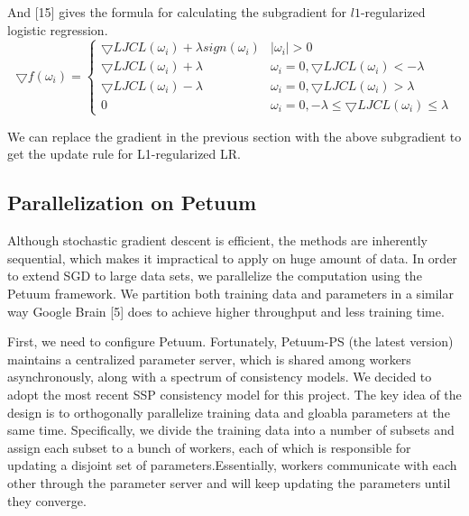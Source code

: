 \documentclass{article} %
\begin{document}
And [15] gives the formula for calculating the subgradient for $l1$-regularized logistic regression.
\begin{equation}
\bigtriangledown f(\omega_i) = \left\{\begin{matrix}
\bigtriangledown LJCL(\omega_i) + \lambda sign(\omega_i) & |\omega_i| > 0\\ 
\bigtriangledown LJCL(\omega_i) + \lambda & \omega_i=0,\bigtriangledown LJCL(\omega_i)<-\lambda\\ 
\bigtriangledown LJCL(\omega_i) - \lambda & \omega_i=0,\bigtriangledown LJCL(\omega_i)>\lambda\\ 
0 & \omega_i=0, -\lambda \le \bigtriangledown LJCL(\omega_i) \le \lambda
\end{matrix}\right.
\end{equation}

We can replace the gradient in the previous section with the above subgradient to get the update rule for L1-regularized LR.

\subsection{Parallelization on Petuum}
Although stochastic gradient descent is efficient, the methods are inherently sequential, which makes it impractical to apply on huge amount of data. In order to extend SGD to large data sets, we parallelize the computation using the Petuum framework. We partition both training data and parameters in a similar way Google Brain [5] does to achieve higher throughput and less training time.

First, we need to configure Petuum. Fortunately, Petuum-PS (the latest version) maintains a centralized parameter server, which is shared among workers asynchronously, along with a spectrum of consistency models. We decided to adopt the most recent SSP consistency model for this project. The key idea of the design is to orthogonally parallelize training data and gloabla parameters at the same time. Specifically, we divide the training data into a number of subsets and assign each subset to a bunch of workers, each of which is responsible for updating a disjoint set of parameters.Essentially, workers communicate with each other through the parameter server and will keep updating the parameters until they converge.
\end{document}

